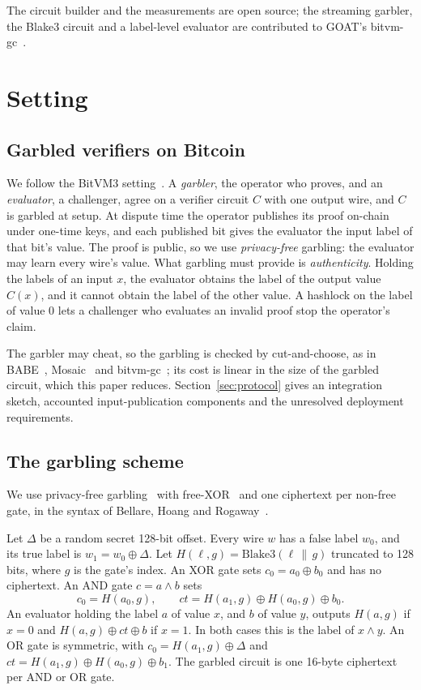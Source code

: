 \documentclass[11pt]{article}
\newcommand{\AND}{\textsf{AND}}
\newcommand{\XOR}{\textsf{XOR}}
\newcommand{\blake}{\mathrm{Blake3}}
\begin{document}
The circuit builder and the measurements are open source; the streaming
garbler, the Blake3 circuit and a label-level evaluator are contributed to
GOAT's bitvm-gc~\cite{bitvmgc}.

\section{Setting}\label{sec:setting}

\subsection{Garbled verifiers on Bitcoin}

We follow the BitVM3 setting~\cite{bitvm3paper}. A \emph{garbler}, the operator
who proves, and an \emph{evaluator}, a challenger, agree on a verifier circuit $C$
with one output wire, and $C$ is garbled at setup. At dispute time the operator
publishes its proof on-chain under one-time keys, and each published bit gives
the evaluator the input label of that bit's value. The proof is public, so we use
\emph{privacy-free} garbling: the evaluator may learn every wire's value. What
garbling must provide is \emph{authenticity}. Holding the labels of an input $x$,
the evaluator obtains the label of the output value $C(x)$, and it cannot obtain
the label of the other value. A hashlock on the label of value 0 lets a challenger
who evaluates an invalid proof stop the operator's claim.

The garbler may cheat, so the garbling is checked by cut-and-choose, as in
BABE~\cite{babe2026}, Mosaic~\cite{mosaic26} and bitvm-gc~\cite{bitvmgc}; its cost
is linear in the size of the garbled circuit, which this paper reduces.
Section~\ref{sec:protocol} gives an integration sketch, accounted
input-publication components and the unresolved deployment requirements.

\subsection{The garbling scheme}\label{sec:garbling}

We use privacy-free garbling~\cite{fno15privacyfree} with free-XOR~\cite{ks08}
and one ciphertext per non-free gate, in the syntax of Bellare, Hoang and
Rogaway~\cite{bhr12foundations}.

Let $\Delta$ be a random
secret 128-bit offset. Every wire $w$ has a false label $w_0$, and its true label
is $w_1=w_0\oplus\Delta$. Let $H(\ell,g)=\blake(\ell\,\|\,g)$ truncated to 128
bits, where $g$ is the gate's index. An \XOR{} gate sets $c_0=a_0\oplus b_0$ and
has no ciphertext. An \AND{} gate $c=a\wedge b$ sets
\[
  c_0 = H(a_0,g), \qquad \mathit{ct} = H(a_1,g)\oplus H(a_0,g)\oplus b_0 .
\]
An evaluator holding the label $a$ of value $x$, and $b$ of value $y$, outputs
$H(a,g)$ if $x=0$ and $H(a,g)\oplus\mathit{ct}\oplus b$ if $x=1$. In both cases
this is the label of $x\wedge y$. An \textsf{OR} gate is symmetric, with
$c_0=H(a_1,g)\oplus\Delta$ and $\mathit{ct}=H(a_1,g)\oplus H(a_0,g)\oplus b_1$.
The garbled circuit is one 16-byte ciphertext per \AND{} or \textsf{OR} gate.
\end{document}

